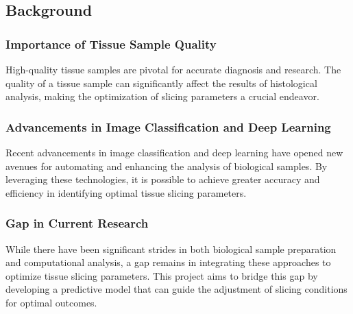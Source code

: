 
\subsection{Background}

\subsubsection{Importance of Tissue Sample Quality}

High-quality tissue samples are pivotal for accurate diagnosis and research. The quality of a tissue sample can significantly affect the results of histological analysis, making the optimization of slicing parameters a crucial endeavor.

\subsubsection{Advancements in Image Classification and Deep Learning}

Recent advancements in image classification and deep learning have opened new avenues for automating and enhancing the analysis of biological samples. By leveraging these technologies, it is possible to achieve greater accuracy and efficiency in identifying optimal tissue slicing parameters.

\subsubsection{Gap in Current Research}

While there have been significant strides in both biological sample preparation and computational analysis, a gap remains in integrating these approaches to optimize tissue slicing parameters. This project aims to bridge this gap by developing a predictive model that can guide the adjustment of slicing conditions for optimal outcomes.


